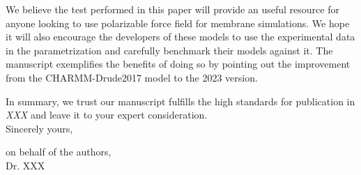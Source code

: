 \documentclass[11pt]{letter}
\begin{document}
We believe the test performed in this paper will provide an useful resource for anyone looking to use polarizable force field for membrane simulations. We hope it will also encourage the developers of these models to use the experimental data in the parametrization and carefully benchmark their models against it. The manuscript exemplifies the benefits of doing so by pointing out the improvement from the CHARMM-Drude2017 model to the 2023 version.

 In summary, we trust our manuscript fulfills the high standards for publication in %
\textit{XXX} and leave it to your expert consideration.\\


Sincerely yours,

on behalf of the authors,\\

Dr. XXX
\end{document}
